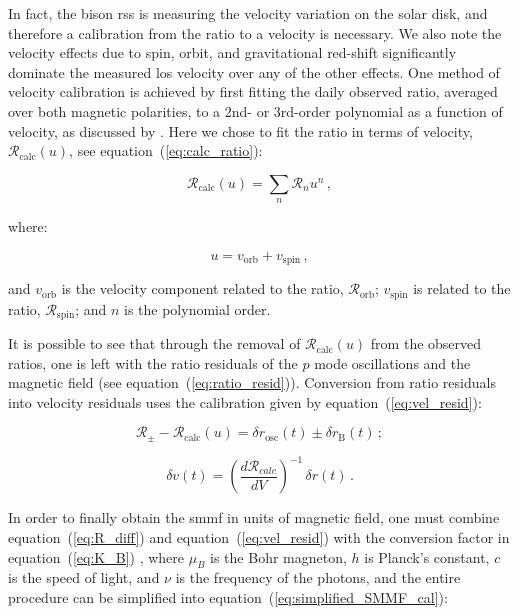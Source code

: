In fact, the \gls{bison} \gls{rss} is measuring the velocity variation on the solar disk, and therefore a calibration from the ratio to a velocity is necessary. We also note the velocity effects due to spin, orbit, and gravitational red-shift significantly dominate the measured \gls{los} velocity over any of the other effects. One method of velocity calibration is achieved by first fitting the daily observed ratio, averaged over both magnetic polarities, to a 2nd- or 3rd-order polynomial as a function of velocity, as discussed by \citet{elsworth_techniques_1995}. Here we chose to fit the ratio in terms of velocity, $\mathcal{R}_{\mathrm{calc}}(u)$, see equation~(\ref{eq:calc_ratio}):

\begin{equation}
\mathcal{R}_{\mathrm{calc}}(u) = \sum_{n} \mathcal{R}_{n} u^n \, ,
\label{eq:calc_ratio}
\end{equation}

where:

\begin{equation}
u = v_{\mathrm{orb}} + v_{\mathrm{spin}} \, ,
\label{eq:stn_vel}
\end{equation}

and $v_{\mathrm{orb}}$ is the velocity component related to the ratio,  $\mathcal{R}_{\mathrm{orb}}$; $v_{\mathrm{spin}}$ is related to the ratio, $\mathcal{R}_{\mathrm{spin}}$; and $n$ is the polynomial order.

It is possible to see that through the removal of $\mathcal{R}_{\mathrm{calc}}(u)$ from the observed ratios, one is left with the ratio residuals of the $p$ mode oscillations and the magnetic field (see equation~(\ref{eq:ratio_resid})). Conversion from ratio residuals into velocity residuals uses the calibration given by equation~(\ref{eq:vel_resid}):

\begin{equation}
\mathcal{R}_{\pm} - \mathcal{R}_{\mathrm{calc}}(u) = \delta {r}_{\mathrm{osc}}(t) \pm \delta {r}_{\mathrm{B}}(t)
\label{eq:ratio_resid} \, ;
\end{equation}

\begin{equation}
\delta v(t) = \left( \frac{d\mathcal{R}_{calc}}{dV} \right)^{-1} \, \delta {r}(t) \, .
\label{eq:vel_resid}
\end{equation}

In order to finally obtain the \gls{smmf} in units of magnetic field, one must combine equation~(\ref{eq:R_diff}) and  equation~(\ref{eq:vel_resid}) with the conversion factor in equation~(\ref{eq:K_B}) \citep{dumbill_observation_1999}, where $\mu_B$ is the Bohr magneton, $h$ is Planck's constant, $c$ is the speed of light, and $\nu$ is the frequency of the photons, and the entire procedure can be simplified into equation~(\ref{eq:simplified_SMMF_cal}):

